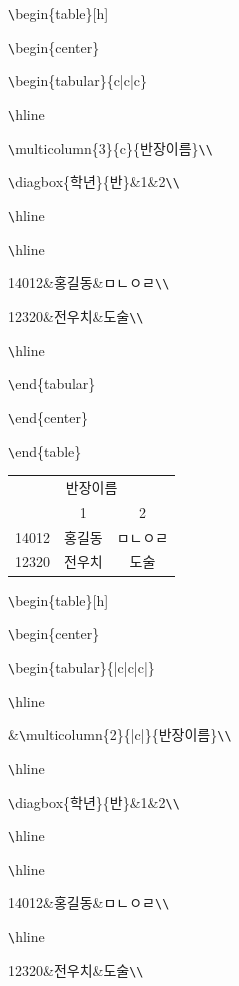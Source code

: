 \documentclass[11pt]{article}
\begin{document}
\longline

\verb+\+begin\{table\}[h]

\verb+\+begin\{center\}

\verb+\+begin\{tabular\}\{c|c|c\}

\verb+\+hline

\verb+\+multicolumn\{3\}\{c\}\{반장이름\}\verb+\+\verb+\+

\verb+\+diagbox\{학년\}\{반\}\&1\&2\verb+\+\verb+\+

\verb+\+hline

\verb+\+hline

14012\&홍길동\&ㅁㄴㅇㄹ\verb+\+\verb+\+

12320\&전우치\&도술\verb+\+\verb+\+

\verb+\+hline

\verb+\+end\{tabular\}

\verb+\+end\{center\}

\verb+\+end\{table\}

\begin{table}[h]
	\begin{center}
	\begin{tabular}{c|c|c}
		\hline
		\multicolumn{3}{c}{반장이름}\\
		\diagbox{학년}{반}&1&2\\
		\hline
		\hline
		14012&홍길동&ㅁㄴㅇㄹ\\
		12320&전우치&도술\\
		\hline
		
	\end{tabular}
	\end{center}
\end{table}

\longline

\verb+\+begin\{table\}[h]

\verb+\+begin\{center\}

\verb+\+begin\{tabular\}\{|c|c|c|\}

\verb+\+hline

\&\verb+\+multicolumn\{2\}\{|c|\}\{반장이름\}\verb+\+\verb+\+

\verb+\+hline

\verb+\+diagbox\{학년\}\{반\}\&1\&2\verb+\+\verb+\+

\verb+\+hline

\verb+\+hline

14012\&홍길동\&ㅁㄴㅇㄹ\verb+\+\verb+\+

\verb+\+hline

12320\&전우치\&도술\verb+\+\verb+\+
\end{document}
